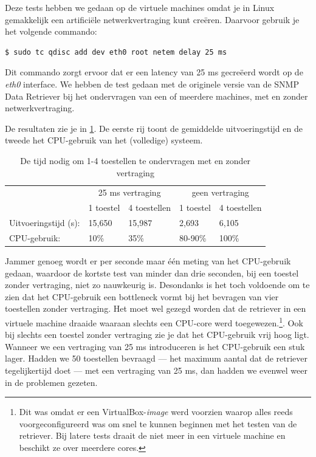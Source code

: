 Deze tests hebben we gedaan op de virtuele machines omdat je in Linux gemakkelijk een artificiële netwerkvertraging kunt creëren.
Daarvoor gebruik je het volgende commando:

\begin{lstlisting}[language=bash, caption={Artificiële netwerkvertraging creëren in Linux}]
$ sudo tc qdisc add dev eth0 root netem delay 25 ms
\end{lstlisting}

Dit commando zorgt ervoor dat er een latency van 25 ms gecreëerd wordt op de \textit{eth0} interface.
We hebben de test gedaan met de originele versie van de SNMP Data Retriever bij het ondervragen van een of meerdere machines,
met en zonder netwerkvertraging.

De resultaten zie je in \cref{tabel-latency}.
De eerste rij toont de gemiddelde uitvoeringstijd en de tweede het CPU-gebruik van het (volledige) systeem.

\begin{table}[h]
\centering
\begin{tabular}{@{}lllll@{}}
\toprule
                      & \multicolumn{2}{c}{25 ms vertraging} & \multicolumn{2}{c}{geen vertraging} \\
                      & 1 toestel       & 4 toestellen       & 1 toestel       & 4 toestellen      \\ \midrule
Uitvoeringstijd (s):  & 15,650          & 15,987             & 2,693           & 6,105             \\
CPU-gebruik:          & 10\%            & 35\%               & 80-90\%         & 100\%    		   \\ \bottomrule
\end{tabular}
\caption{De tijd nodig om 1-4 toestellen te ondervragen met en zonder vertraging}
\label{tabel-latency}
\end{table}

Jammer genoeg wordt er per seconde maar één meting van het CPU-gebruik gedaan, waardoor
de kortste test van minder dan drie seconden, bij een toestel zonder vertraging, niet zo nauwkeurig is.
Desondanks is het toch voldoende om te zien dat het CPU-gebruik een bottleneck vormt bij het bevragen van vier toestellen zonder vertraging.
Het moet wel gezegd worden dat de retriever in een virtuele machine draaide waaraan slechts een CPU-core werd toegewezen.\footnote{
	Dit was omdat er een VirtualBox-\textit{image} werd voorzien waarop alles reeds voorgeconfigureerd was om snel te kunnen beginnen met het testen van de retriever.
	Bij latere tests draait de \nwmretriever{} niet meer in een virtuele machine en beschikt ze over meerdere cores.
}.
Ook bij slechts een toestel zonder vertraging zie je dat het CPU-gebruik vrij hoog ligt.
Wanneer we een vertraging van 25 ms introduceren is het CPU-gebruik een stuk lager.
Hadden we 50 toestellen bevraagd --- het maximum aantal dat de retriever tegelijkertijd doet --- met een vertraging van 25 ms,
dan hadden we evenwel weer in de problemen gezeten.

